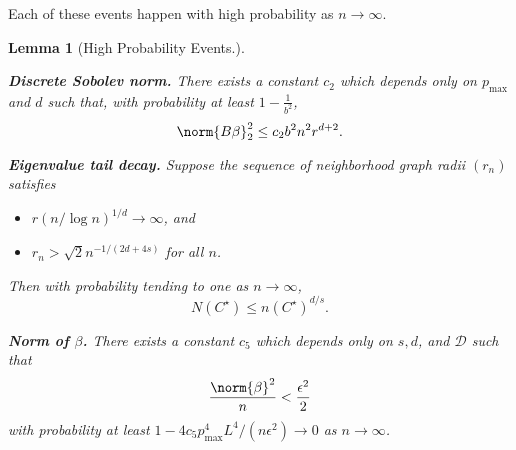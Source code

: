 \documentclass{article}
\newcommand{\1}{\mathbf{1}}
\theoremstyle{alden}
\theoremstyle{aldenthm}
\newtheorem{lemma}{Lemma}
\theoremstyle{definition}
\theoremstyle{remark}
\begin{document}
Each of these events happen with high probability as $n \to \infty$.
\begin{lemma}[High Probability Events.]
	\label{lem:high_probability_events}
	\mbox{}
	
	\textbf{Discrete Sobolev norm.}
	There exists a constant $c_2$ which depends only on $p_{\max}$ and $d$ such that, with probability at least $1 - \frac{1}{b^2}$,
	\begin{equation}
	\label{eqn:discrete_sobolev_norm}
	\norm{B\beta}_2^2 \leq c_2 b^2 n^2 r^{d + 2}.
	\end{equation}
	
	\textbf{Eigenvalue tail decay.}
	Suppose the sequence of neighborhood graph radii $(r_n)$ satisfies
	\begin{itemize}
		\item $r(n/\log n)^{1/d} \to \infty$, and
		\item $r_n > \sqrt{2}n^{-1/(2d + 4s)}$ for all $n$.
	\end{itemize} 
	Then with probability tending to one as $n \to \infty$,
	\begin{equation}
	\label{eqn:eigenvalue_tail_decay}
	N(C^{\star}) \leq n(C^{\star})^{d/s}.
	\end{equation}
	
	\textbf{Norm of $\beta$.}
	There exists a constant $c_5$ which depends only on $s,d$, and $\mathcal{D}$ such that
	\begin{equation}
	\label{eqn:l2_norm}
	\frac{\norm{\beta}^2}{n} < \frac{\epsilon^2}{2}
	\end{equation}
	with probability at least $1  - 4c_5p_{\max}^4L^4/(n\epsilon^2) \to 0$ as $n \to \infty$. 
\end{lemma}
\end{document}
